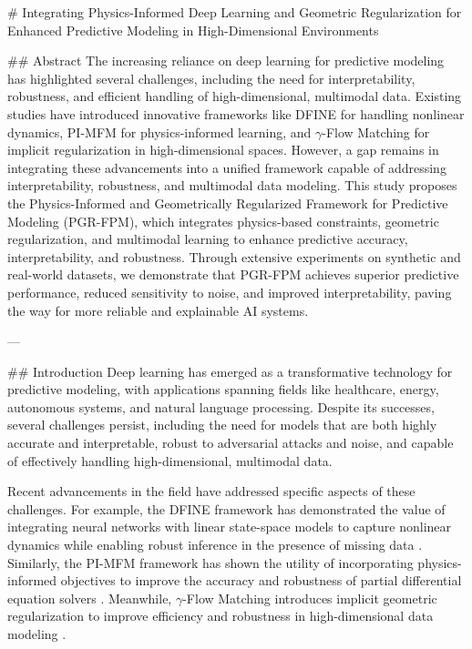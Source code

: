 # Integrating Physics-Informed Deep Learning and Geometric Regularization for Enhanced Predictive Modeling in High-Dimensional Environments

## Abstract
The increasing reliance on deep learning for predictive modeling has highlighted several challenges, including the need for interpretability, robustness, and efficient handling of high-dimensional, multimodal data. Existing studies have introduced innovative frameworks like DFINE for handling nonlinear dynamics, PI-MFM for physics-informed learning, and $\gamma$-Flow Matching for implicit regularization in high-dimensional spaces. However, a gap remains in integrating these advancements into a unified framework capable of addressing interpretability, robustness, and multimodal data modeling. This study proposes the Physics-Informed and Geometrically Regularized Framework for Predictive Modeling (PGR-FPM), which integrates physics-based constraints, geometric regularization, and multimodal learning to enhance predictive accuracy, interpretability, and robustness. Through extensive experiments on synthetic and real-world datasets, we demonstrate that PGR-FPM achieves superior predictive performance, reduced sensitivity to noise, and improved interpretability, paving the way for more reliable and explainable AI systems.

---

## Introduction
Deep learning has emerged as a transformative technology for predictive modeling, with applications spanning fields like healthcare, energy, autonomous systems, and natural language processing. Despite its successes, several challenges persist, including the need for models that are both highly accurate and interpretable, robust to adversarial attacks and noise, and capable of effectively handling high-dimensional, multimodal data.

Recent advancements in the field have addressed specific aspects of these challenges. For example, the DFINE framework has demonstrated the value of integrating neural networks with linear state-space models to capture nonlinear dynamics while enabling robust inference in the presence of missing data \cite{vaziri2025nonlineardynamicalmodelinghuman}. Similarly, the PI-MFM framework has shown the utility of incorporating physics-informed objectives to improve the accuracy and robustness of partial differential equation solvers \cite{zhu2025pimfmphysicsinformedmultimodalfoundation}. Meanwhile, $\gamma$-Flow Matching introduces implicit geometric regularization to improve efficiency and robustness in high-dimensional data modeling \cite{eguchi2025implicitgeometricregularizationflow}.

